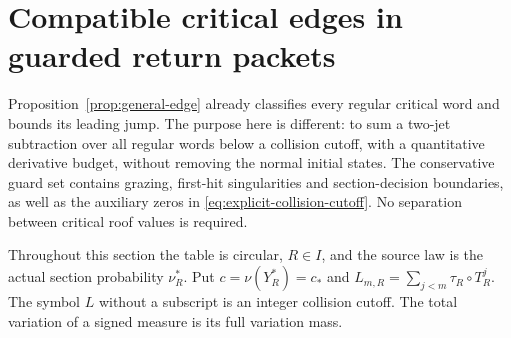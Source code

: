 \section{Compatible critical edges in guarded return packets}
\label{sec:v42-morse-packet}
Proposition~\ref{prop:general-edge} already classifies every regular
critical word and bounds its leading jump. The purpose here is different:
to sum a two-jet subtraction over all regular words below a collision
cutoff, with a quantitative derivative budget, without removing the
normal initial states. The conservative guard set contains grazing, first-hit singularities
and section-decision boundaries, as well as the auxiliary zeros in
\eqref{eq:explicit-collision-cutoff}. No separation between critical
roof values is required.

Throughout this section the table is circular, $R\in I$, and the source
law is the actual section probability $\nu_R^*$. Put
$c=\nu(Y_R^*)=c_*$ and $L_{m,R}=\sum_{j<m}\tau_R\circ T_R^j$.
The symbol $L$ without a subscript is an integer collision cutoff.
The total variation of a signed measure is its full variation mass.

